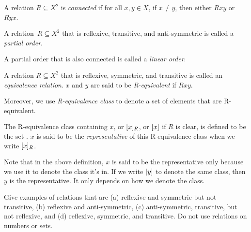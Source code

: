 \documentclass[../../../include/open-logic-section]{subfiles}
\begin{document}
\begin{defn}[Connectivity]
A relation $R \subseteq X^2$ is \emph{connected} if for all $x,y\in
X$, if $x \neq y$, then either $Rxy$ or~$Ryx$.
\end{defn}

\begin{defn}
A relation~$R \subseteq X^2$ that is reflexive, transitive, and
anti-symmetric is called a \emph{partial order}. 
\end{defn}

\begin{defn}
A partial order that is also connected is called a \emph{linear order}.
\end{defn}

\begin{defn}
A relation $R \subseteq X^2$ that is reflexive, symmetric, and
transitive is called an \emph{equivalence relation}. $x$ and $y$ are
said to be \emph{R-equivalent} if $Rxy$.
\end{defn}

Moreover, we use \emph{R-equivalence class} to denote a set of
elements that are R-equivalent.
\begin{defn}
  The R-equivalence class containing $x$, or $\eqc{x}[R]$, or
  $\eqc{x}$ if $R$ is clear, is defined to
  be the set . $x$ is said to be the \emph{representative} of this
  R-equivalence class when we write $\eqc{x}[R]$.
\end{defn}

\begin{explain}
  Note that in the above definition, $x$ is said to be the
  representative only because we use it to denote the class it's in.
  If we write $\eqc{y}$ to denote the same class, then $y$ is the
  representative. It only depends on how we denote the class.
\end{explain}

\begin{prob}
Give examples of relations that are (a) reflexive and symmetric but
not transitive, (b) reflexive and anti-symmetric, (c) anti-symmetric,
transitive, but not reflexive, and (d) reflexive, symmetric, and
transitive.  Do not use relations on numbers or sets.
\end{prob}
\end{document}
